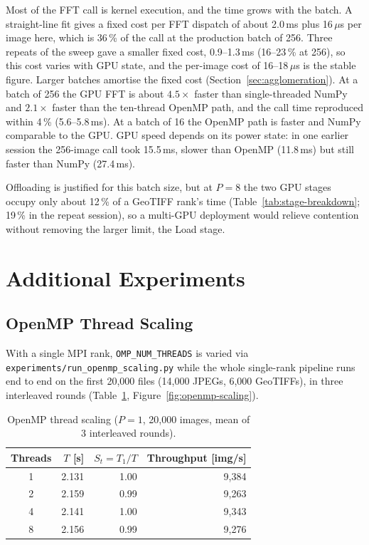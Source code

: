 \documentclass[a4paper,12pt]{report}
\begin{document}
Most of the FFT call is kernel execution, and the time grows with the batch.
A straight-line fit gives a fixed cost per FFT dispatch of about 2.0\,ms plus
16\,$\mu$s per image here, which is 36\,\% of the call at the production batch
of 256. Three repeats of the sweep gave a smaller fixed cost, 0.9--1.3\,ms
(16--23\,\% at 256), so this cost varies with GPU state, and the per-image cost
of 16--18\,$\mu$s is the stable figure. Larger batches amortise the fixed cost
(Section~\ref{sec:agglomeration}). At a batch of 256 the GPU FFT is about
$4.5\times$ faster than single-threaded NumPy and $2.1\times$ faster than the
ten-thread OpenMP path, and the call time reproduced within 4\,\% (5.6--5.8\,ms).
At a batch of 16 the OpenMP path is faster and NumPy comparable to the GPU. GPU
speed depends on its power state: in one earlier session the 256-image call took
15.5\,ms, slower than OpenMP (11.8\,ms) but still faster than NumPy (27.4\,ms).

Offloading is justified for this batch size,
but at $P=8$ the two GPU stages occupy only about 12\,\% of a
GeoTIFF rank's time (Table~\ref{tab:stage-breakdown}; 19\,\% in the repeat session), so a
multi-GPU deployment would relieve contention without removing the larger
limit, the Load stage.

\section{Additional Experiments}
\label{sec:additional-experiments}

\subsection{OpenMP Thread Scaling}

With a single MPI rank, \texttt{OMP\_\discretionary{}{}{}NUM\_\discretionary{}{}{}THREADS} is varied via
\texttt{experiments\slash{}run\_\discretionary{}{}{}openmp\_\discretionary{}{}{}scaling.py} while the whole single-rank
pipeline runs end to end on the first 20{,}000 files (14{,}000 JPEGs, 6{,}000
GeoTIFFs), in three interleaved rounds (Table~\ref{tab:openmp-scaling},
Figure~\ref{fig:openmp-scaling}).

\begin{table}[H]
\centering
\caption{OpenMP thread scaling ($P=1$, 20{,}000 images, mean of 3 interleaved
rounds).}
\label{tab:openmp-scaling}
\begin{tabular}{@{}crrr@{}}
\toprule
\textbf{Threads} & $T$ [s] & $S_t = T_1/T$ &
\textbf{Throughput [img/s]} \\
\midrule
1 & 2.131 & 1.00 & 9,384 \\
2 & 2.159 & 0.99 & 9,263 \\
4 & 2.141 & 1.00 & 9,343 \\
8 & 2.156 & 0.99 & 9,276 \\
\bottomrule
\end{tabular}
\end{table}
\end{document}
